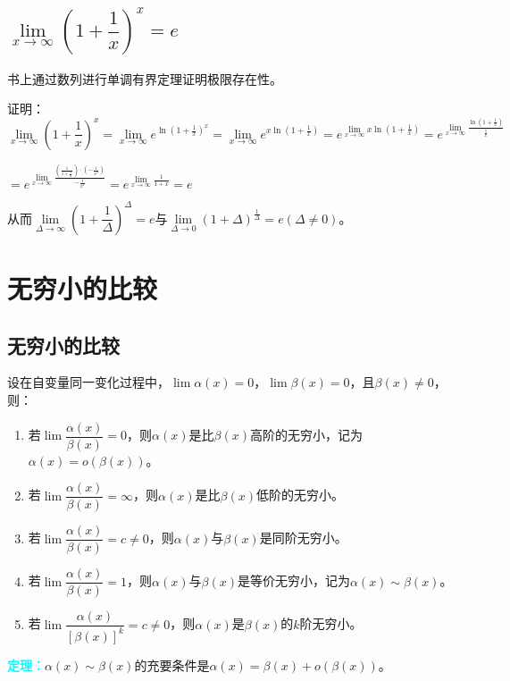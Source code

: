 \documentclass[UTF8, 12pt]{ctexart}
\begin{document}
\subsection{\texorpdfstring{$\lim\limits_{x\to\infty}\left(1+\dfrac{1}{x}\right)^x=e$}{}}

书上通过数列进行单调有界定理证明极限存在性。

证明：$\lim\limits_{x\to\infty}\left(1+\dfrac{1}{x}\right)^x=\lim\limits_{x\to\infty}e^{\ln(1+\frac{1}{x})^x}=\lim\limits_{x\to\infty}e^{x\ln(1+\frac{1}{x})}=e^{\lim\limits_{x\to\infty}x\ln(1+\frac{1}{x})}=e^{\lim\limits_{x\to\infty}\frac{\ln(1+\frac{1}{x})}{\frac{1}{x}}}$

$=e^{\lim\limits_{x\to\infty}\frac{\left(\frac{1}{1+\frac{1}{x}}\right)\cdot\left(-\frac{1}{x^2}\right)}{-\frac{1}{x^2}}}=e^{\lim\limits_{x\to\infty}\frac{1}{1+x}}=e$\medskip

从而$\lim\limits_{\Delta\to\infty}\left(1+\dfrac{1}{\Delta}\right)^\Delta=e$与$\lim\limits_{\Delta\to 0}\left(1+\Delta\right)^{\frac{1}{\Delta}}=e(\Delta\neq 0)$。

\section{无穷小的比较}

\subsection{无穷小的比较}

设在自变量同一变化过程中，$\lim\alpha(x)=0$，$\lim\beta(x)=0$，且$\beta(x)\neq 0$，则：

\begin{enumerate}
    \item 若$\lim\dfrac{\alpha(x)}{\beta(x)}=0$，则$\alpha(x)$是比$\beta(x)$高阶的无穷小，记为$\alpha(x)=o(\beta(x))$。
    \item 若$\lim\dfrac{\alpha(x)}{\beta(x)}=\infty$，则$\alpha(x)$是比$\beta(x)$低阶的无穷小。
    \item 若$\lim\dfrac{\alpha(x)}{\beta(x)}=c\neq 0$，则$\alpha(x)$与$\beta(x)$是同阶无穷小。
    \item 若$\lim\dfrac{\alpha(x)}{\beta(x)}=1$，则$\alpha(x)$与$\beta(x)$是等价无穷小，记为$\alpha(x)\sim\beta(x)$。
    \item 若$\lim\dfrac{\alpha(x)}{[\beta(x)]^k}=c\neq 0$，则$\alpha(x)$是$\beta(x)$的$k$阶无穷小。
\end{enumerate}

\textcolor{aqua}{\textbf{定理：}}$\alpha(x)\sim\beta(x)$的充要条件是$\alpha(x)=\beta(x)+o(\beta(x))$。
\end{document}
